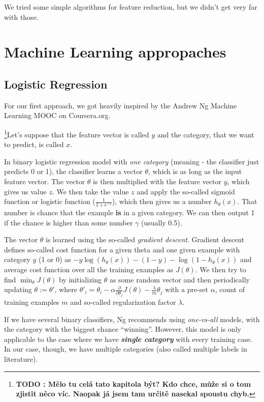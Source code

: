 \documentclass[letterpaper]{article}
\newcommand{\todofn}[1] {
 \footnote{\textbf{TODO : #1}}}
\begin{document}
We tried some simple algorithms for feature reduction, but we didn't get very far with those.

\section{Machine Learning appropaches}
\subsection{Logistic Regression}
For our first approach, we got heavily inspired by the Andrew Ng Machine Learning MOOC  on Coursera.org.

\todofn{Mělo tu celá tato kapitola být? Kdo chce, může si o tom zjistit něco víc. Naopak já jsem tam určitě nasekal spoustu chyb.}Let's suppose that the feature vector is called $y$ and the category, that we want to predict, is called $x$.

In binary logistic regression model with \emph{one category} (meaning - the classifier just predicts 0 or 1), the classifier learns a vector $\theta$, which is as long as the input feature vector. The vector $\theta$ is then multiplied with the feature vector $y$, which gives us value $z$. We then take the value $z$ and apply the so-called sigmoid function or logistic function ($\frac{1}{1+e^{-z}}$), which then gives us a number $h_\theta(x)$. That number is chance that the example \textbf{is} in a given category. We can then output 1 if the chance is higher than some number $\gamma$ (usually 0.5).

The vector $\theta$ is learned using the so-called \emph{gradient descent}. Gradient descent defines so-called cost function for a given theta and one given example with category $y$ (1 or 0) as $-y \log(h_\theta(x))-(1-y)-\log(1-h_\theta(x))$ and average cost function over all the training examples as $J(\theta)$. We then try to find $\min_\theta J(\theta)$ by initializing $\theta$ as some random vector and then periodically updating $\theta:=\theta'$, where $\theta'_i=\theta_i-\alpha\frac{\partial}{\partial \theta_j}J(\theta)-\frac{\lambda}{m}\theta_j$ with a pre-set $\alpha$, count of training examples $m$ and so-called regularization factor $\lambda$.

If we have several binary classifiers, Ng recommends using \emph{one-vs-all} models, with the category with the biggest chance ``winning''. However, this model is only applicable to the case where we have \textbf{\emph{single category}} with every training case. 
In our case, though, we have multiple categories (also called multiple labels in literature). 
\end{document}
